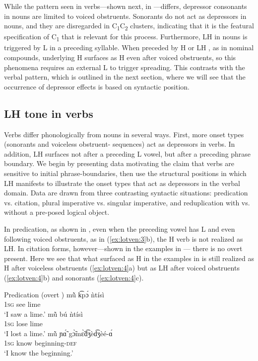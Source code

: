 \documentclass[output=paper
,newtxmath
,modfonts
,nonflat]{langsci/langscibook}
\begin{document}
While the pattern seen in verbs—shown next, in —differs, depressor consonants in nouns are limited to voiced obstruents. Sonorants do not act as depressors in nouns, and they are disregarded in C\textsubscript{1}C\textsubscript{2} clusters, indicating that it is the featural specification of C\textsubscript{1} that is relevant for this process. Furthermore, LH  in nouns is triggered by L  in a preceding syllable. When preceded by H or LH , as in nominal compounds, underlying H surfaces as H even after voiced obstruents, so this phenomena requires an external L  to trigger spreading. This contrasts with the verbal pattern, which is outlined in the next section, where we will see that the occurrence of depressor effects is based on syntactic position.

\subsection{LH tone in verbs}\label{sec:lotven:4.2}

Verbs differ phonologically from nouns in several ways. First, more onset types (sonorants and voiceless obstruent- sequences) act as depressors in verbs. In addition, LH  surfaces not after a preceding L  vowel, but after a preceding phrase boundary. We begin by presenting data motivating the claim that verbs are sensitive to initial phrase-boundaries, then use the structural positions in which LH  manifests to illustrate the onset types that act as depressors in the verbal domain. Data are drawn from three contrasting syntactic situations: predication vs. citation, plural imperative vs. singular imperative, and reduplication with vs. without a pre-posed logical object.

In predication, as shown in , even when the preceding vowel has L  and even following voiced obstruents, as in (\ref{ex:lotven:3}b), the H  verb is not realized as LH. In citation forms, however—shown in the examples in  — there is no overt  present. Here we see that what surfaced as H in the examples in  is still realized as H after voiceless obstruents (\ref{ex:lotven:4}a) but as LH after voiced obstruents (\ref{ex:lotven:4}b) and sonorants (\ref{ex:lotven:4}c).

\ea\label{ex:lotven:3} Predication (overt )
\ea\label{ex:lotven:3a} \gll mũ̀ k͡pɔ́ ǹtísì\\
1\textsc{sg} see lime \\
\glt ‘I saw a lime.’ 
\ex\label{ex:lotven:3b}	\gll mũ̀ bú ǹtísì\\
1\textsc{sg} lose lime\\
\glt ‘I lost a lime.’
\ex\label{ex:lotven:3c} \gll mũ̀ ɲɑ̃́ gɔ̃̀mɛ̃̀d͡ʒèd͡ʒèé-ɑ́\\
1\textsc{sg} know beginning-\textsc{def} \\
\glt ‘I know the beginning.’
\z
\z
\end{document}
